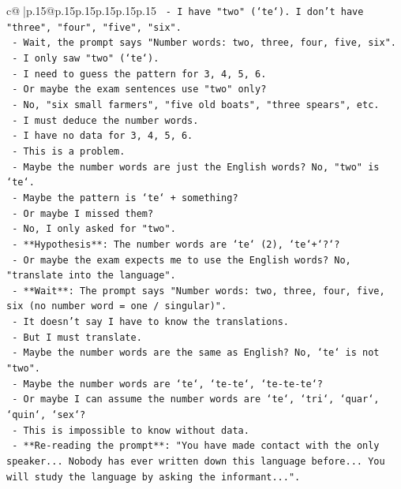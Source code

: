 \documentclass{article}
\begin{document}
{\begin{supertabular}{c@{$\;$}|p{.15\linewidth}@{}p{.15\linewidth}p{.15\linewidth}p{.15\linewidth}p{.15\linewidth}p{.15\linewidth}}
{{{\texttt{    {-} I have "two" (`te`). I don't have "three", "four", "five", "six".} \\
\texttt{    {-} Wait, the prompt says "Number words: two, three, four, five, six".} \\
\texttt{    {-} I only saw "two" (`te`).} \\
\texttt{    {-} I need to guess the pattern for 3, 4, 5, 6.} \\
\texttt{    {-} Or maybe the exam sentences use "two" only?} \\
\texttt{    {-} No, "six small farmers", "five old boats", "three spears", etc.} \\
\texttt{    {-} I must deduce the number words.} \\
\texttt{    {-} I have no data for 3, 4, 5, 6.} \\
\texttt{    {-} This is a problem.} \\
\texttt{    {-} Maybe the number words are just the English words? No, "two" is `te`.} \\
\texttt{    {-} Maybe the pattern is `te` + something?} \\
\texttt{    {-} Or maybe I missed them?} \\
\texttt{    {-} No, I only asked for "two".} \\
\texttt{    {-} **Hypothesis**: The number words are `te` (2), `te`+`?`?} \\
\texttt{    {-} Or maybe the exam expects me to use the English words? No, "translate into the language".} \\
\texttt{    {-} **Wait**: The prompt says "Number words: two, three, four, five, six (no number word = one / singular)".} \\
\texttt{    {-} It doesn't say I have to know the translations.} \\
\texttt{    {-} But I must translate.} \\
\texttt{    {-} Maybe the number words are the same as English? No, `te` is not "two".} \\
\texttt{    {-} Maybe the number words are `te`, `te{-}te`, `te{-}te{-}te`?} \\
\texttt{    {-} Or maybe I can assume the number words are `te`, `tri`, `quar`, `quin`, `sex`?} \\
\texttt{    {-} This is impossible to know without data.} \\
\texttt{    {-} **Re{-}reading the prompt**: "You have made contact with the only speaker... Nobody has ever written down this language before... You will study the language by asking the informant...".} \\
}}}
\end{supertabular}}
\end{document}
